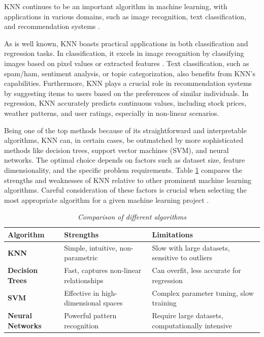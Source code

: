 \documentclass[10pt,twocolumn]{article}
\begin{document}
KNN continues to be an important algorithm in machine learning, with applications in various domains, such as image recognition, text classification, and recommendation systems \cite{moldagulova2017,bansal2022}. 

As is well known, KNN boasts practical applications in both classification and regression tasks. In classification, it excels in image recognition by classifying images based on pixel values or extracted features \cite{zhao2016}. Text classification, such as spam/ham, sentiment analysis, or topic categorization, also benefits from KNN's capabilities. Furthermore, KNN plays a crucial role in recommendation systems by suggesting items to users based on the preferences of similar individuals. In regression, KNN accurately predicts continuous values, including stock prices, weather patterns, and user ratings, especially in non-linear scenarios.

Being one of the top methods because of its straightforward and interpretable algorithms, KNN can, in certain cases, be outmatched by more sophisticated methods like decision trees, support vector machines (SVM), and neural networks. The optimal choice depends on factors such as dataset size, feature dimensionality, and the specific problem requirements. Table \ref{tab:comparison} compares the strengths and weaknesses of KNN relative to other prominent machine learning algorithms. Careful consideration of these factors is crucial when selecting the most appropriate algorithm for a given machine learning project \cite{fan2021}.
\renewcommand{\tablename}{Table}
\renewcommand{\figurename}{Figure}
\begin{table}[!ht]
\centering
\caption{\textit{Comparison of different algorithms}}
\label{tab:comparison}
\renewcommand{\arraystretch}{1.5} %
\begin{tabular}{|p{3cm}|p{5.5cm}|p{5.5cm}|}
\hline
\textbf{Algorithm} & \textbf{Strengths} & \textbf{Limitations} \\
\hline
\textbf{KNN} & Simple, intuitive, non-parametric & Slow with large datasets, sensitive to outliers \\
\hline
\textbf{Decision Trees} & Fast, captures non-linear relationships & Can overfit, less accurate for regression \\
\hline
\textbf{SVM} & Effective in high-dimensional spaces & Complex parameter tuning, slow training \\
\hline
\textbf{Neural Networks} & Powerful pattern recognition & Require large datasets, computationally intensive \\
\hline
\end{tabular}
\end{table}
\end{document}

